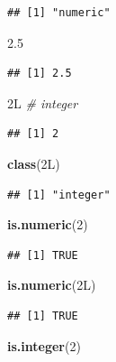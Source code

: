\documentclass[]{book}
\newenvironment{Shaded}{\begin{snugshade}}{\end{snugshade}}
\newcommand{\KeywordTok}[1]{\textcolor[rgb]{0.13,0.29,0.53}{\textbf{{#1}}}}
\newcommand{\DecValTok}[1]{\textcolor[rgb]{0.00,0.00,0.81}{{#1}}}
\newcommand{\FloatTok}[1]{\textcolor[rgb]{0.00,0.00,0.81}{{#1}}}
\newcommand{\CommentTok}[1]{\textcolor[rgb]{0.56,0.35,0.01}{\textit{{#1}}}}
\newcommand{\NormalTok}[1]{{#1}}
\begin{document}
\begin{verbatim}
## [1] "numeric"
\end{verbatim}

\begin{Shaded}
\begin{Highlighting}[]
\FloatTok{2.5}
\end{Highlighting}
\end{Shaded}

\begin{verbatim}
## [1] 2.5
\end{verbatim}

\begin{Shaded}
\begin{Highlighting}[]
\NormalTok{2L  }\CommentTok{# integer}
\end{Highlighting}
\end{Shaded}

\begin{verbatim}
## [1] 2
\end{verbatim}

\begin{Shaded}
\begin{Highlighting}[]
\KeywordTok{class}\NormalTok{(2L)}
\end{Highlighting}
\end{Shaded}

\begin{verbatim}
## [1] "integer"
\end{verbatim}

\begin{Shaded}
\begin{Highlighting}[]
\KeywordTok{is.numeric}\NormalTok{(}\DecValTok{2}\NormalTok{)}
\end{Highlighting}
\end{Shaded}

\begin{verbatim}
## [1] TRUE
\end{verbatim}

\begin{Shaded}
\begin{Highlighting}[]
\KeywordTok{is.numeric}\NormalTok{(2L)}
\end{Highlighting}
\end{Shaded}

\begin{verbatim}
## [1] TRUE
\end{verbatim}

\begin{Shaded}
\begin{Highlighting}[]
\KeywordTok{is.integer}\NormalTok{(}\DecValTok{2}\NormalTok{)}
\end{Highlighting}
\end{Shaded}
\end{document}
